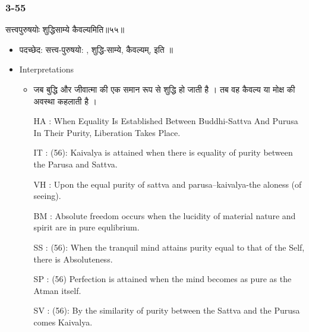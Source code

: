 \begin{frame}[fragile]\frametitle{3-55}
\begin{sanskrit}
सत्त्वपुरुषयोः शुद्धिसाम्ये कैवल्यमिति॥५५॥
\end{sanskrit}

	\begin{itemize}
	\item पदच्छेद:  सत्त्व-पुरुषयो: , शुद्धि-साम्ये, कैवल्यम्, इति ॥
	\item Interpretations
		\begin{itemize}	
		\item जब बुद्धि और जीवात्मा की एक समान रूप से शुद्धि हो जाती है । तब वह कैवल्य या मोक्ष की अवस्था कहलाती है ।
		\item [HA]: When Equality Is Established Between Buddhi-Sattva And Purusa In Their Purity, Liberation Takes Place.
		\item [IT]: (56): Kaivalya is attained when there is equality of purity between the Parusa and Sattva.
		\item [VH]: Upon the equal purity of sattva and parusa–kaivalya-the aloness (of seeing).
		\item [BM]: Absolute freedom occurs when the lucidity of material nature and spirit are in pure equlibrium.
		\item [SS]: (56): When the tranquil mind attains purity equal to that of the Self, there is Absoluteness.
		\item [SP]: (56) Perfection is attained when the mind becomes as pure as the Atman itself.
		\item [SV]: (56): By the similarity of purity between the Sattva and the Purusa comes Kaivalya. 
		\end{itemize}
	\end{itemize}
\end{frame}

